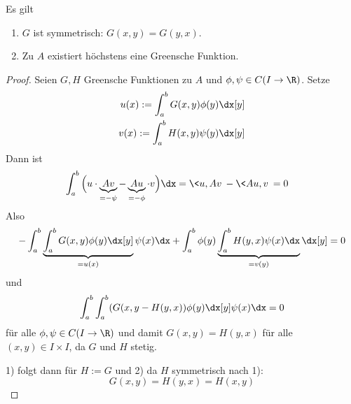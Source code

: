 \begin{st} \label{3.13}
	Es gilt
	\begin{enumerate}[1)]
		\item
			$G$ ist symmetrisch: $G(x,y) = G(y,x)$.
		\item
			Zu $A$ existiert höchstens eine Greensche Funktion.
	\end{enumerate}
	\begin{proof}
		Seien $G,H$ Greensche Funktionen zu $A$ und $\phi, \psi \in C(I \to \R)$.
		Setze
		\begin{align*}
			u(x) := \int_a^b G(x,y) \phi(y) \dx[y] \\
			v(x) := \int_a^b H(x,y) \psi(y) \dx[y] \\
		\end{align*}
		Dann ist
		\begin{align*}
			\int_a^b \Big(u \cdot \underbrace{Av}_{= -\psi} - \underbrace{Au}_{= - \phi} \cdot v\Big) \dx
			&= \<u,Av\> - \<Au,v\> = 0
		\end{align*}
		Also
		\begin{align*}
			-\int_a^b \underbrace{\int_a^b G(x,y) \phi(y) \dx[y]}_{= u(x)} \psi(x) \dx + \int_a^b \phi(y) \underbrace{\int_a^b H(y,x) \psi(x) \dx}_{= v(y)} \dx[y] = 0
		\end{align*}
		und
		\[
			\int_a^b \int_a^b (G(x,y - H(y,x)) \phi(y) \dx[y] \psi(x) \dx = 0
		\]
		für alle $\phi, \psi \in C(I \to \R)$ und damit $G(x,y) = H(y,x)$ für alle $(x,y) \in I\times I$, da $G$ und $H$ stetig.

		1) folgt dann für $H:= G$ und 2) da $H$ symmetrisch nach 1):
		\[
			G(x,y) = H(y,x) = H(x,y) 
		\]
	\end{proof}
\end{st}

